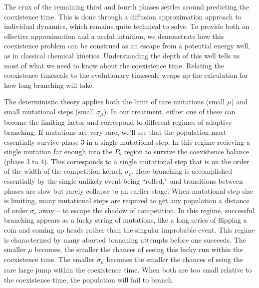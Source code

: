 \documentclass{article}
\begin{document}
The crux of the remaining third and fourth phases settles around predicting the coexistence time.  This is done through a diffusion approximation approach to individual dynamics, which remains quite technical to solve.  To provide both an effective approximation and a useful intuition, we demonstrate how this coexistence problem can be construed as an escape from a potential energy well, as in classical chemical kinetics.  Understanding the depth of this well tells us most of what we need to know about the coexistence time.  Relating the coexistence timescale to the evolutionary timescale wraps up the calculation for how long branching will take.  

The deterministic theory applies both the limit of rare mutations (small $\mu$) and small mutational steps (small $\sigma_{\mu}$).  In our treatment, either one of these can become the limiting factor and correspond to different regimes of adaptive branching.  If mutations are very rare, we'll see that the population must essentially survive phase 3 in a single mutational step.  In this regime recieving a single mutation far enough into the $P_2$ region to survive the coexistence balance (phase 3 to 4).  This corresponds to a single mutational step that is on the order of the width of the competition kernel, $\sigma_c$.  Here branching is accomplished essentially by the single unlikely event being ``rolled,'' and transitions between phases are slow but rarely collapse to an earlier stage.  When mutational step size is limiting, many mutational steps are required to get any population a distance of order $\sigma_c$ away -- to escape the shadow of competition.  In this regime, successful branching appears as a lucky string of mutations, like a long series of flipping a coin and coming up heads rather than the singular improbable event.  This regime is characterized by many aborted branching attempts before one succeeds.  The smaller $\mu$ becomes, the smaller the chances of seeing this lucky run within the coexistence time.  The smaller $\sigma_{\mu}$ becomes the smaller the chances of seing the rare large jump within the coexistence time.  When both are too small relative to the coexistence time, the population will fail to branch.  
\end{document}
